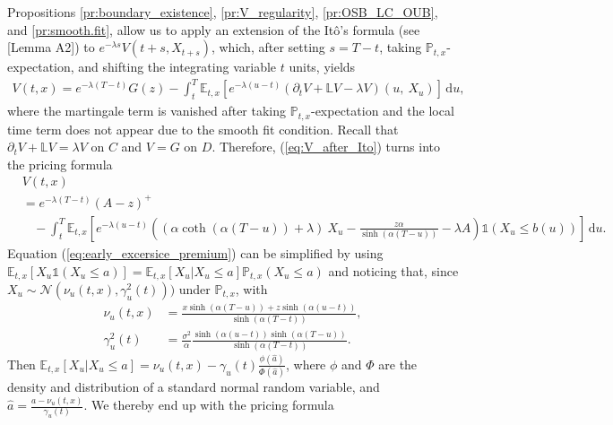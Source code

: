 \documentclass{tufte-handout}
\newcommand{\E}{\mathbb{E}} %
\renewcommand{\Pr}{\mathbb{P}} %
\begin{document}
	Propositions \ref{pr:boundary_existence}, \ref{pr:V_regularity}, \ref{pr:OSB_LC_OUB}, and \ref{pr:smooth.fit}, allow us to apply an extension of the Itô's formula (see \citet{d2020discounted}[Lemma A2]) to $e^{-\lambda s}V(t + s, X_{t + s})$, which, after setting $s = T - t$, taking $\Pr_{t, x}$-expectation, and shifting the integrating variable $t$ units, yields
	\begin{align}\label{eq:V_after_Ito}
	V(t, x) = e^{-\lambda (T - t)}G(z) - \int_{t}^{T}\E_{t, x}\left[e^{-\lambda (u - t)}(\partial_t V + \mathbb{L} V - \lambda V)(u,\ X_u)\right]\,\mathrm{d}u,
	\end{align} 
	where the martingale term is vanished after taking $\Pr_{t, x}$-expectation and the local time term does not appear due to the smooth fit condition. Recall that $\partial_t V + \mathbb{L} V = \lambda V$ on $C$ and $V = G$ on $D$. Therefore, (\ref{eq:V_after_Ito}) turns into the pricing formula
	\begin{equation}\label{eq:early_excersice_premium}
	\begin{aligned}
	&V\left(t, x\right) \\
	&= e^{-\lambda (T - t)}(A - z)^+ \\
	&\ \ \ \ - \int_{t}^{T}\E_{t, x}\left[e^{-\lambda (u - t)}\left(\left(\alpha\coth(\alpha(T - u)) + \lambda\right)\ X_{u} - \frac{z\alpha}{\sinh(\alpha(T - u))} - \lambda A \right)\mathbb{1}\left(X_{u}\leq b(u)\right)\right]\,\mathrm{d}u.
	\end{aligned}
	\end{equation}
	Equation (\ref{eq:early_excersice_premium}) can be simplified by using $\E_{t, x}[X_u\mathbb{1}(X_u\leq a)] = \E_{t, x}[X_u|X_u\leq a]\Pr_{t, x}(X_u \leq a)$ and noticing that, since $X_u\sim\mathcal{N}(\nu_u(t, x), \gamma_u^2(t)))$ under $\Pr_{t, x}$, with
	\begin{align}
	\nu_u(t, x) &= \frac{x\sinh(\alpha (T - u)) + z\sinh(\alpha (u - t))}{\sinh(\alpha (T - t))}, \label{eq:mean_Xu}\\
	\gamma_u^2(t) &= \frac{\sigma^2}{\alpha}\frac{\sinh(\alpha (u - t))\sinh(\alpha (T - u))}{\sinh(\alpha (T - t))} \label{eq:var_Xu}.
	\end{align}
	Then $\E_{t, x}[X_u | X_u \leq a] = \nu_u(t, x) - \gamma_u(t)\frac{\phi(\hat{a})}{\Phi(\hat{a})}$, where $\phi$ and $\Phi$ are the density and distribution of a standard normal random variable, and $\hat{a} = \frac{a - \nu_u(t, x)}{\gamma_u(t)}$. We thereby end up with the pricing formula
\end{document}
